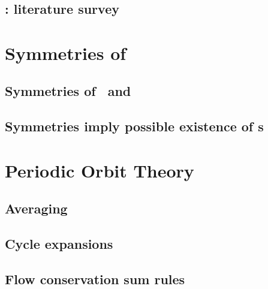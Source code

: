 \documentclass[hyperref]{inputs/gatech-thesis}
\begin{document}
\chapter{\KSe}
\label{chap:pCf}

    \section{\KS: literature survey}
        \label{sec:KSlit}
        

\chapter{\KSe}
\label{chap:KSe}
%    

\chapter{Symmetries of \KS}
\label{chap:Symmetry}

    \section{Symmetries of \eqva\ and \reqva}

    \section{Symmetries imply possible existence of \rpo s}
        \label{sec:SymRPO}
        

\chapter{Periodic Orbit Theory}
\label{chap:POT}
    \section{Averaging}
% 	

    \section{Cycle expansions}
        \label{sec:cycExp}
        

    \section{Flow conservation sum rules}
        \label{s-Cons-m-flow}
        
\end{document}
